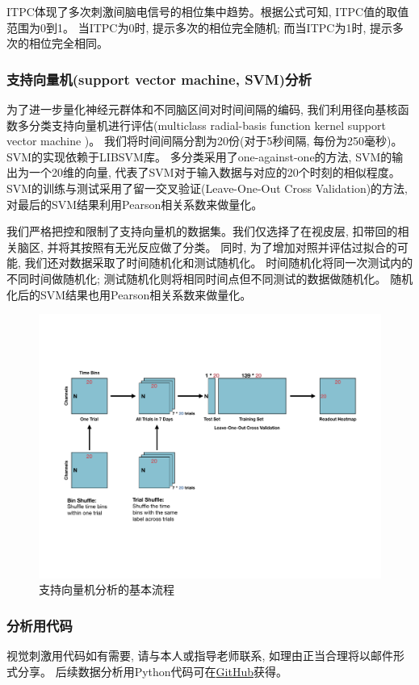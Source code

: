 ITPC体现了多次刺激间脑电信号的相位集中趋势。根据公式可知, ITPC值的取值范围为0到1。
当ITPC为0时, 提示多次的相位完全随机; 而当ITPC为1时, 提示多次的相位完全相同。

\subsubsection{支持向量机(support vector machine, SVM)分析}
为了进一步量化神经元群体和不同脑区间对时间间隔的编码,
我们利用径向基核函数多分类支持向量机进行评估(multiclass radial-basis function kernel support vector machine )。
我们将时间间隔分割为20份(对于5秒间隔, 每份为250毫秒)。
SVM的实现依赖于LIBSVM库\cite{chang2011libsvm}。
多分类采用了one-against-one的方法, SVM的输出为一个20维的向量, 代表了SVM对于输入数据与对应的20个时刻的相似程度。
SVM的训练与测试采用了留一交叉验证(Leave-One-Out Cross Validation)的方法, 对最后的SVM结果利用Pearson相关系数来做量化。

我们严格把控和限制了支持向量机的数据集。我们仅选择了在视皮层, 扣带回的相关脑区, 并将其按照有无光反应做了分类。
同时, 为了增加对照并评估过拟合的可能, 我们还对数据采取了时间随机化和测试随机化。
时间随机化将同一次测试内的不同时间做随机化;
测试随机化则将相同时间点但不同测试的数据做随机化。
随机化后的SVM结果也用Pearson相关系数来做量化。

\begin{figure}[h]
    \centering
    \includegraphics[width=\textwidth]{src/figures/svm_workflow.pdf}
    \caption{支持向量机分析的基本流程}
    \label{fig:svm_scheme}
\end{figure}

\subsubsection{分析用代码}
视觉刺激用代码如有需要, 请与本人或指导老师联系, 如理由正当合理将以邮件形式分享。
后续数据分析用Python代码可在\href{https://github.com/ZhangJiayiLab/EEGAnalysis/releases/tag/v1.0}{GitHub}获得。
